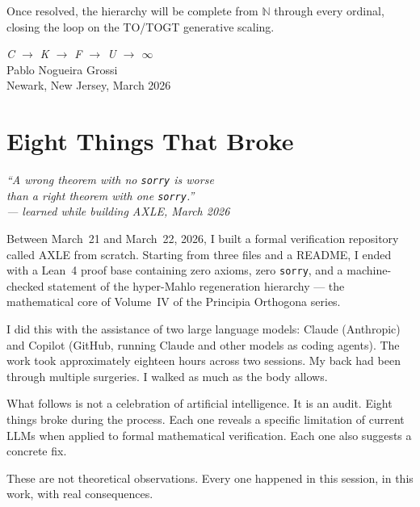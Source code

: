 Once resolved, the hierarchy will be complete from \(\mathbb{N}\) through every ordinal, closing the loop on the TO/TOGT generative scaling.

\bigskip
\begin{flushright}
\textit{C \;$\to$\; K \;$\to$\; F \;$\to$\; U \;$\to$\; $\infty$}\\[0.3em]
Pablo Nogueira Grossi\\
Newark, New Jersey, March 2026
\end{flushright}

\chapter{Eight Things That Broke}
\label{ch:eight-things}

\begin{center}
\itshape
``A wrong theorem with no \texttt{sorry} is worse\\
than a right theorem with one \texttt{sorry}.''\\[0.5em]
\normalfont\small --- learned while building AXLE, March 2026
\end{center}

\vspace{0.5cm}

\noindent Between March~21 and March~22, 2026, I built a formal
verification repository called AXLE from scratch. Starting from
three files and a README, I ended with a Lean~4 proof base containing
zero axioms, zero \texttt{sorry}, and a machine-checked statement
of the hyper-Mahlo regeneration hierarchy --- the mathematical core
of Volume~IV of the Principia Orthogona series.

I did this with the assistance of two large language models: Claude
(Anthropic) and Copilot (GitHub, running Claude and other models
as coding agents). The work took approximately eighteen hours across
two sessions. My back had been through multiple surgeries. I walked
as much as the body allows.

What follows is not a celebration of artificial intelligence. It is
an audit. Eight things broke during the process. Each one reveals
a specific limitation of current LLMs when applied to formal
mathematical verification. Each one also suggests a concrete fix.

These are not theoretical observations. Every one happened in this
session, in this work, with real consequences.

